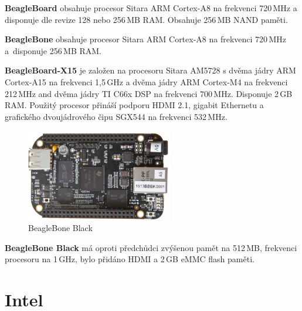 \textbf{BeagleBoard} obsahuje procesor Sitara ARM Cortex-A8 na frekvenci 720\,MHz a disponuje dle revize 128 nebo 256\,MB RAM. Obsahuje 256\,MB NAND paměti.

\textbf{BeagleBone} obsahuje procesor Sitara ARM Cortex-A8 na frekvenci 720\,MHz a~disponuje 256\,MB RAM.

\textbf{BeagleBoard-X15} je založen na procesoru Sitara AM5728 s dvěma jádry ARM Cortex-A15 na frekvenci 1,5\,GHz a dvěma jádry ARM Cortex-M4 na frekvenci 212\,MHz and dvěma jádry TI C66x DSP na frekvenci 700\,MHz. Disponuje 2\,GB RAM. Použitý procesor přináší podporu HDMI 2.1, gigabit Ethernetu a grafického dvoujádrového čipu SGX544 na frekvenci 532\,MHz. 

	\begin{figure}[!ht]
  \begin{center}
    \includegraphics[height=4cm]{obrazky/embed_beaglebone_black}
  \end{center}
	\vspace{-20pt}
  \caption{BeagleBone Black~\cite{BeagleBone}}
\end{figure}

\textbf{BeagleBone Black} má oproti předchůdci zvýšenou pamět na 512\,MB, frekvenci procesoru na 1\,GHz, bylo přidáno HDMI a 2\,GB eMMC flash paměti.


\section{Intel}
\label{KapIntel}

